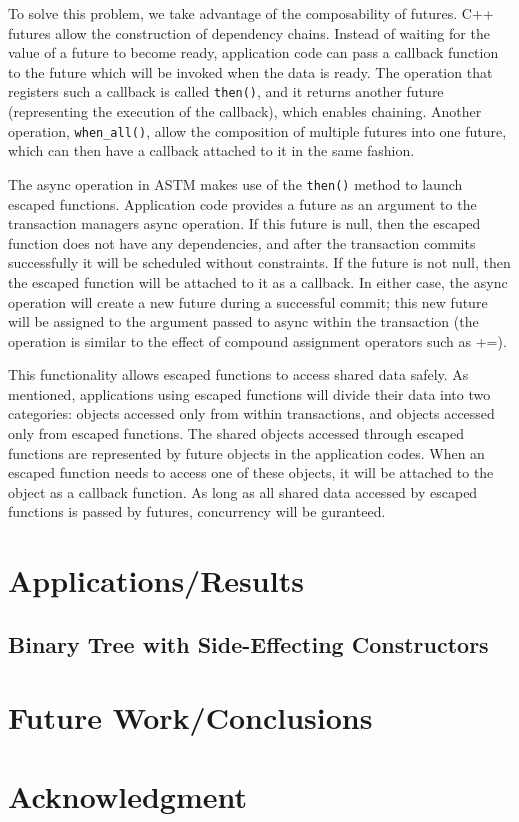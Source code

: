 \documentclass[conference]{IEEEtran}
\begin{document}
To solve this problem, we take advantage of the composability of futures. C++ futures allow the construction of dependency chains. Instead of waiting for the value of a future to become ready, application code can pass a callback function to the future which will be invoked when the data is ready. The operation that registers such a callback is called \lstinline$then()$, and it returns another future (representing the execution of the callback), which enables chaining. Another operation, \lstinline$when_all()$, allow the composition of multiple futures into one future, which can then have a callback attached to it in the same fashion.

The async operation in ASTM makes use of the \lstinline$then()$ method to launch escaped functions. Application code provides a future as an argument to the transaction managers async operation. If this future is null, then the escaped function does not have any dependencies, and after the transaction commits successfully it will be scheduled without constraints. If the future is not null, then the escaped function will be attached to it as a callback. In either case, the async operation will create a new future during a successful commit; this new future will be assigned to the argument passed to async within the transaction (the operation is similar to the effect of compound assignment operators such as +=).

This functionality allows escaped functions to access shared data safely. As mentioned, applications using escaped functions will divide their data into two categories: objects accessed only from within transactions, and objects accessed only from escaped functions. The shared objects accessed through escaped functions are represented by future objects in the application codes. When an escaped function needs to access one of these objects, it will be attached to the object as a callback function. As long as all shared data accessed by escaped functions is passed by futures, concurrency will be guranteed.

\section{Applications/Results}

\subsection{Binary Tree with Side-Effecting Constructors}

\section{Future Work/Conclusions}

\section*{Acknowledgment}

%
%

\end{document}
